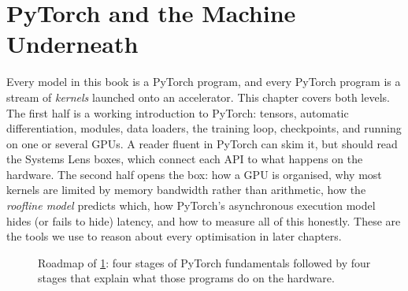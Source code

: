 \chapter{PyTorch and the Machine Underneath}\label{ch:pytorch}

Every model in this book is a PyTorch program, and every PyTorch program is a stream of \emph{kernels}
launched onto an accelerator. This chapter covers both levels. The first half is a working introduction
to PyTorch: tensors, automatic differentiation, modules, data loaders, the training loop, checkpoints, and
running on one or several GPUs. A reader fluent in PyTorch can skim it, but should read the Systems Lens
boxes, which connect each API to what happens on the hardware. The second half opens the box: how a GPU
is organised, why most kernels are limited by memory bandwidth rather than arithmetic, how the
\emph{roofline model} predicts which, how PyTorch's asynchronous execution model hides (or fails to hide)
latency, and how to measure all of this honestly. These are the tools we use to reason about every
optimisation in later chapters.

\begin{figure}[t]
\centering
{}
\caption{Roadmap of \cref{ch:pytorch}: four stages of PyTorch fundamentals followed by four stages that
explain what those programs do on the hardware.}
\label{fig:pytorch:roadmap}
\end{figure}

